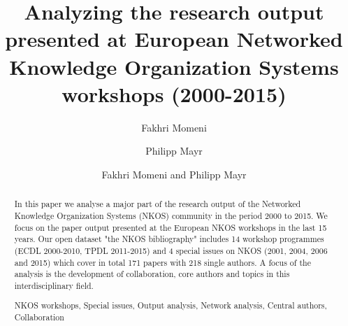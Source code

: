 \documentclass[runningheads,a4paper]{llncs}
\newcommand{\keywords}[1]{\par\addvspace\baselineskip
\noindent\keywordname\enspace\ignorespaces#1}
\begin{document}
\mainmatter  %

\title{Analyzing the research output presented at European Networked Knowledge Organization Systems workshops (2000-2015)}



%
%
\author{Fakhri Momeni%
	\and Philipp Mayr}
%

\author{Fakhri Momeni and Philipp Mayr}

%
%

\maketitle


\begin{abstract}		
In this paper we analyse a major part of the research output of the Networked Knowledge Organization Systems (NKOS) community in the period 2000 to 2015. We focus on the paper output presented at the European NKOS workshops in the last 15 years. Our open dataset "the NKOS bibliography" includes 14 workshop programmes (ECDL 2000-2010, TPDL 2011-2015) and 4 special  issues on NKOS (2001, 2004, 2006 and 2015) which cover in total 171 papers with 218 single authors. A focus of the analysis is the development of collaboration, core authors and topics in this interdisciplinary field. %

 
\keywords{NKOS workshops, Special issues, Output analysis, Network analysis, Central authors, Collaboration}
\end{abstract}
\end{document}
